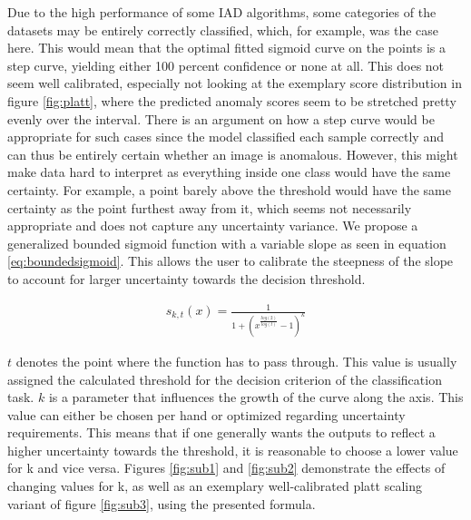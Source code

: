 Due to the high performance of some IAD algorithms, some categories 
of the datasets may be entirely correctly classified, which, for example, was the case here. This would mean that the optimal fitted sigmoid curve on the points 
is a step curve, yielding either 100 percent confidence or none at all. This does not seem well calibrated, especially not looking at the exemplary score distribution in figure \ref{fig:platt}, where the predicted anomaly scores seem to be stretched pretty evenly over the interval. There is an argument on how a step 
curve would be appropriate for such cases since the model classified each sample correctly and can thus be entirely certain whether an 
image is anomalous. However, this might make data hard to interpret as everything inside one class 
would have the same certainty. For example, a point barely above the threshold would have the same certainty as the point furthest away from it, 
which seems not necessarily appropriate and does not capture any uncertainty variance.
We propose a generalized bounded sigmoid function with a variable slope \cite{bounded_sigmoid} as seen in equation \ref{eq:boundedsigmoid}. This allows the user to calibrate the steepness of the slope to account for larger uncertainty 
towards the decision threshold.

\begin{equation}
    \label{eq:boundedsigmoid}
    \begin{split}
        s_{k, t}(x) = \frac{1}{1 + (x^{\frac{log(2)}{log(t)}} - 1)^{k}}
    \end{split}
\end{equation}

$t$ denotes the point where the function has to pass through. This value is usually assigned the calculated threshold for the decision criterion of the classification task. $k$ is a parameter 
that influences the growth of the curve along the axis. This value can either be chosen per hand or optimized regarding uncertainty requirements. This means that if one generally wants the 
outputs to reflect a higher uncertainty towards the threshold, it is reasonable to choose a lower value for k and vice versa. Figures \ref{fig:sub1} and \ref{fig:sub2} demonstrate the effects of changing values for k, as well 
as an exemplary well-calibrated platt scaling variant of figure \ref{fig:sub3}, using the presented formula.

